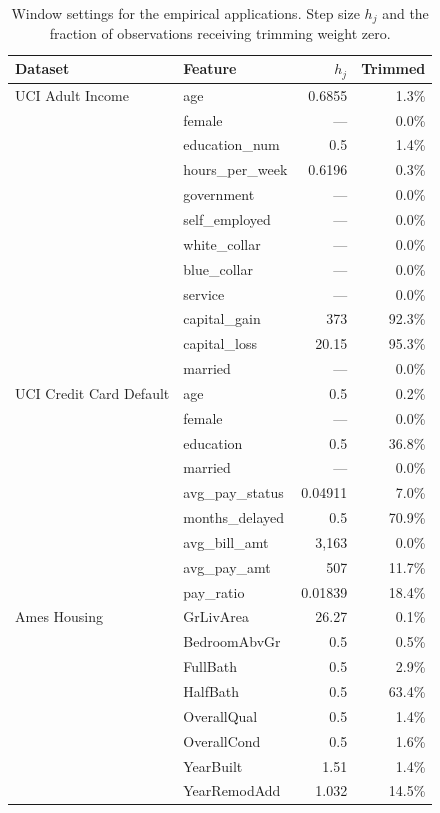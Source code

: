 \begin{table}[htbp]
\centering
\small
\begin{threeparttable}
\caption{Window settings for the empirical applications. Step size $h_j$ and the fraction of observations receiving trimming weight zero.}
\label{tab:window_settings}
\begin{tabular}{llrr}
\toprule
Dataset & Feature & $h_j$ & Trimmed \\
\midrule
UCI Adult Income & age & 0.6855 & 1.3\% \\
 & female & --- & 0.0\% \\
 & education\_num & 0.5 & 1.4\% \\
 & hours\_per\_week & 0.6196 & 0.3\% \\
 & government & --- & 0.0\% \\
 & self\_employed & --- & 0.0\% \\
 & white\_collar & --- & 0.0\% \\
 & blue\_collar & --- & 0.0\% \\
 & service & --- & 0.0\% \\
 & capital\_gain & 373 & 92.3\% \\
 & capital\_loss & 20.15 & 95.3\% \\
 & married & --- & 0.0\% \\
\midrule
UCI Credit Card Default & age & 0.5 & 0.2\% \\
 & female & --- & 0.0\% \\
 & education & 0.5 & 36.8\% \\
 & married & --- & 0.0\% \\
 & avg\_pay\_status & 0.04911 & 7.0\% \\
 & months\_delayed & 0.5 & 70.9\% \\
 & avg\_bill\_amt & 3,163 & 0.0\% \\
 & avg\_pay\_amt & 507 & 11.7\% \\
 & pay\_ratio & 0.01839 & 18.4\% \\
\midrule
Ames Housing & GrLivArea & 26.27 & 0.1\% \\
 & BedroomAbvGr & 0.5 & 0.5\% \\
 & FullBath & 0.5 & 2.9\% \\
 & HalfBath & 0.5 & 63.4\% \\
 & OverallQual & 0.5 & 1.4\% \\
 & OverallCond & 0.5 & 1.6\% \\
 & YearBuilt & 1.51 & 1.4\% \\
 & YearRemodAdd & 1.032 & 14.5\% \\

\end{tabular}
\end{threeparttable}
\end{table}
